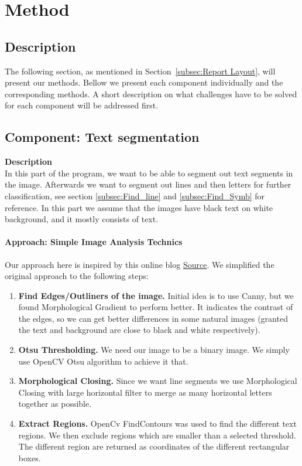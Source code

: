 \documentclass[Report.tex]{subfiles}
\begin{document}
\chapter{Method}
\label{chap:Method}
\section{Description}
The following section, as mentioned in Section~\ref{subsec:Report Layout}, will present our methods. Bellow we present each component individually and the corresponding methods. A short description on what challenges have to
be solved for each component will be addressed first.

\section{Component: Text segmentation}
\label{Method:Text_segmentation}

\begin{flushleft}
  \textbf{Description} \\
In this part of the program, we want to be able to segment out text segments in the image. Afterwards we want to segment out lines and then letters for further classification, see section \ref{subsec:Find_line} and \ref{subsec:Find_Symb} for reference. In this part we assume that the images have black text on white background, and it mostly consists of text.
\end{flushleft}

\begin{flushleft}
  \subsubsection{Approach: Simple Image Analysis Technics}
  Our approach here is inspired by this online blog \href{https://www.danvk.org/2015/01/07/finding-blocks-of-text-in-an-image-using-python-opencv-and-numpy.html}{Source}\cite{_finding_????}. We simplified the original approach to the following steps:
  \begin{enumerate}
    \item \textbf{Find Edges/Outliners of the image.}
    Initial idea is to use Canny, but we found Morphological Gradient to perform better. It indicates the contrast of the edges, so we can get better differences in some natural images (granted the text and background are close to black and white respectively).
    \item \textbf{Otsu Thresholding.}
    We need our image to be a binary image. We simply use OpenCV Otsu algorithm to achieve it that.
    \item \textbf{Morphological Closing.}
    Since we want line segments we use Morphological Closing with large horizontal filter to merge as many horizontal letters together as possible.
    \item \textbf{Extract Regions.}
    OpenCv FindContours was used to find the different text regions. We then exclude regions which are smaller than a selected threshold. The different region are returned as coordinates of the different rectangular boxes.
  \end{enumerate}
\end{flushleft}
\end{document}
